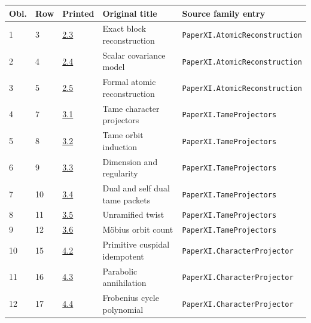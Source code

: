 \documentclass[10pt,oneside]{book}
\begin{document}
\begin{longtable}{@{}p{}p{}p{}>{\raggedright\arraybackslash}p{}p{}@{}}\toprule Obl.&Row&Printed&Original title&Source family entry\\\midrule\endhead

1&3&\href{https://komorebi.invalid/b06/obligation_01}{2.3}&Exact block reconstruction&\nolinkurl{PaperXI.AtomicReconstruction}\\

2&4&\href{https://komorebi.invalid/b06/obligation_02}{2.4}&Scalar covariance model&\nolinkurl{PaperXI.AtomicReconstruction}\\

3&5&\href{https://komorebi.invalid/b06/obligation_03}{2.5}&Formal atomic reconstruction&\nolinkurl{PaperXI.AtomicReconstruction}\\

4&7&\href{https://komorebi.invalid/b06/obligation_04}{3.1}&Tame character projectors&\nolinkurl{PaperXI.TameProjectors}\\

5&8&\href{https://komorebi.invalid/b06/obligation_05}{3.2}&Tame orbit induction&\nolinkurl{PaperXI.TameProjectors}\\

6&9&\href{https://komorebi.invalid/b06/obligation_06}{3.3}&Dimension and regularity&\nolinkurl{PaperXI.TameProjectors}\\

7&10&\href{https://komorebi.invalid/b06/obligation_07}{3.4}&Dual and self dual tame packets&\nolinkurl{PaperXI.TameProjectors}\\

8&11&\href{https://komorebi.invalid/b06/obligation_08}{3.5}&Unramified twist&\nolinkurl{PaperXI.TameProjectors}\\

9&12&\href{https://komorebi.invalid/b06/obligation_09}{3.6}&Möbius orbit count&\nolinkurl{PaperXI.TameProjectors}\\

10&15&\href{https://komorebi.invalid/b06/obligation_10}{4.2}&Primitive cuspidal idempotent&\nolinkurl{PaperXI.CharacterProjector}\\

11&16&\href{https://komorebi.invalid/b06/obligation_11}{4.3}&Parabolic annihilation&\nolinkurl{PaperXI.CharacterProjector}\\

12&17&\href{https://komorebi.invalid/b06/obligation_12}{4.4}&Frobenius cycle polynomial&\nolinkurl{PaperXI.CharacterProjector}\\


\end{longtable}
\end{document}
